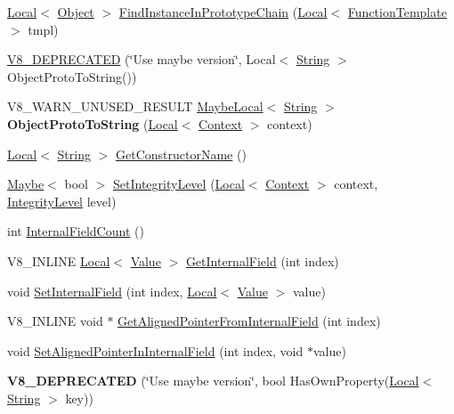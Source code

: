 \begin{DoxyCompactItemize}
\item 
\hyperlink{classv8_1_1_local}{Local}$<$ \hyperlink{classv8_1_1_object}{Object} $>$ \hyperlink{classv8_1_1_object_ae2ad9fee9db6e0e5da56973ebb8ea2bc}{Find\+Instance\+In\+Prototype\+Chain} (\hyperlink{classv8_1_1_local}{Local}$<$ \hyperlink{classv8_1_1_function_template}{Function\+Template} $>$ tmpl)
\item 
\hyperlink{classv8_1_1_object_a06bb9aab716e466b8fa0e0c3fbb8f5d7}{V8\+\_\+\+D\+E\+P\+R\+E\+C\+A\+T\+ED} (\char`\"{}Use maybe version\char`\"{}, Local$<$ \hyperlink{classv8_1_1_string}{String} $>$ Object\+Proto\+To\+String())
\item 
V8\+\_\+\+W\+A\+R\+N\+\_\+\+U\+N\+U\+S\+E\+D\+\_\+\+R\+E\+S\+U\+LT \hyperlink{classv8_1_1_maybe_local}{Maybe\+Local}$<$ \hyperlink{classv8_1_1_string}{String} $>$ {\bfseries Object\+Proto\+To\+String} (\hyperlink{classv8_1_1_local}{Local}$<$ \hyperlink{classv8_1_1_context}{Context} $>$ context)\hypertarget{classv8_1_1_object_a7a65552d78eff4a1b9755f99167f4255}{}\label{classv8_1_1_object_a7a65552d78eff4a1b9755f99167f4255}

\item 
\hyperlink{classv8_1_1_local}{Local}$<$ \hyperlink{classv8_1_1_string}{String} $>$ \hyperlink{classv8_1_1_object_a7bbe987794658f20a3ec1b68326305e6}{Get\+Constructor\+Name} ()
\item 
\hyperlink{classv8_1_1_maybe}{Maybe}$<$ bool $>$ \hyperlink{classv8_1_1_object_ac45163422a18bb7481cc78fcacecb301}{Set\+Integrity\+Level} (\hyperlink{classv8_1_1_local}{Local}$<$ \hyperlink{classv8_1_1_context}{Context} $>$ context, \hyperlink{namespacev8_a02642d03ff1eecc2fd358626499c2e30}{Integrity\+Level} level)
\item 
int \hyperlink{classv8_1_1_object_aaec28576353eebe6fee113bce2718ecc}{Internal\+Field\+Count} ()
\item 
V8\+\_\+\+I\+N\+L\+I\+NE \hyperlink{classv8_1_1_local}{Local}$<$ \hyperlink{classv8_1_1_value}{Value} $>$ \hyperlink{classv8_1_1_object_aa3324fdf652d8ac3b2f27faa0559231d}{Get\+Internal\+Field} (int index)
\item 
void \hyperlink{classv8_1_1_object_aebf949a0592cebc144bb2f96bfb7ec72}{Set\+Internal\+Field} (int index, \hyperlink{classv8_1_1_local}{Local}$<$ \hyperlink{classv8_1_1_value}{Value} $>$ value)
\item 
V8\+\_\+\+I\+N\+L\+I\+NE void $\ast$ \hyperlink{classv8_1_1_object_a435f68bb7ef0f64dd522c5c910682448}{Get\+Aligned\+Pointer\+From\+Internal\+Field} (int index)
\item 
void \hyperlink{classv8_1_1_object_a0ccba69581f0b5e4e672bab90f26879b}{Set\+Aligned\+Pointer\+In\+Internal\+Field} (int index, void $\ast$value)
\item 
{\bfseries V8\+\_\+\+D\+E\+P\+R\+E\+C\+A\+T\+ED} (\char`\"{}Use maybe version\char`\"{}, bool Has\+Own\+Property(\hyperlink{classv8_1_1_local}{Local}$<$ \hyperlink{classv8_1_1_string}{String} $>$ key))\hypertarget{classv8_1_1_object_a332143937efdc58dac2d877ebeb5f8ef}{}\label{classv8_1_1_object_a332143937efdc58dac2d877ebeb5f8ef}


\end{DoxyCompactItemize}
